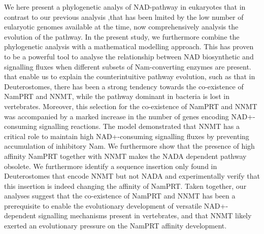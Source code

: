 We here present a phylogenetic analys of NAD-pathway in eukaryotes that  in contrast to our previous analysis ,that has been lmited by the low number of eularyotic genomes available at the time, now comprehensively analysis the evolution of the pathway. In the present study, we furthermore combine the phylogenetic analysis with a mathematical modelling approach. This has proven to be  a powerful tool to analyse the relationship between NAD biosynthetic and signalling fluxes when different subsets of Nam-converting enzymes are present. that enable us to explain the counterintuitive pathway evolution, such as that in Deuterostomes, there has been a strong tendency towards the co-existence of NamPRT and NNMT, while the pathway dominant in bacteria is lost in vertebrates. Moreover, this selection for the co-existence of NamPRT and NNMT was accompanied by a marked increase in the number of genes encoding NAD+-consuming signalling reactions.  The model demonstrated that NNMT has a critical role to maintain high NAD+-consuming signalling fluxes by preventing accumulation of inhibitory Nam. We furthermore show that the presence of high affinity NamPRT together with NNMT makes the NADA dependent pathway obsolete. We  furthermore identify a sequence insertion only found in Deuterostomes that encode NNMT but not NADA and experimentally verify that this insertion is indeed changing the affinity of NamPRT.
Taken together, our analyses suggest that the co-existence of NamPRT and NNMT has been a prerequisite to enable the evolutionary development of versatile NAD+-dependent signalling mechanisms present in vertebrates, and that NNMT likely exerted an evolutionary pressure on the NamPRT affinity development.
